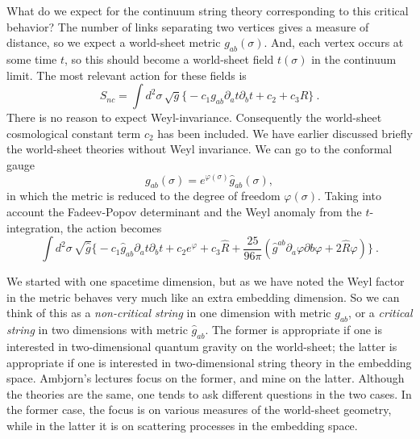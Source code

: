 
What do we expect for the continuum string theory corresponding to
this critical behavior?  The number of links separating two vertices
gives a measure of distance, so we expect a world-sheet metric
$g_{ab}(\sigma)$.  And, each vertex occurs at some time $t$, so this
should become a world-sheet field $t(\sigma)$ in the continuum limit. 
The most relevant action for these fields is
\begin{equation}
S_{nc} = \int d^2\sigma \, \sqrt{g} \biggl\{
-c_1 g_{ab} \partial_a t \partial_b t + c_2 + c_3 R \biggr\}\ .
\end{equation}
There is no reason to expect Weyl-invariance.  Consequently the
world-sheet cosmological constant term $c_2$ has been included.
We have earlier discussed briefly the world-sheet theories without
Weyl invariance.  We can go to the conformal gauge
\begin{equation}
g_{ab}(\sigma) = e^{\varphi(\sigma)} \hat g_{ab}(\sigma),
\end{equation}
in which the metric is reduced to the degree of freedom
$\varphi(\sigma)$. Taking into account the Fadeev-Popov
determinant and the Weyl anomaly from the $t$-integration, the
action becomes~\cite{Poly1}
\begin{equation}
\int d^2\sigma \, \sqrt{\hat g} \biggl\{
-c_1 \hat g_{ab} \partial_a t \partial_b t + c_2 e^{\varphi} + c_3
\hat R + \frac{25}{96\pi} 
( \hat g^{ab} \partial_a \varphi \partial b \varphi + 2 \hat R
\varphi ) \biggr\}\ . \label{tvar}
\end{equation}

We started with one spacetime dimension, but as we have noted
the Weyl factor in the metric behaves very much like an extra
embedding dimension.  So we can think of this as a
{\it non-critical
string} in one dimension with metric $g_{ab}$, or a {\it critical
string} in two dimensions with metric $\hat g_{ab}$.  The former is
appropriate if one is interested in two-dimensional quantum
gravity on the world-sheet; the latter is appropriate if one is
interested in two-dimensional string theory in the embedding space.
Ambjorn's lectures focus on the former, and mine
on the latter.  Although the theories are the same, one tends to
ask different questions in the two cases.  In the former case,
the focus is on various measures of the world-sheet geometry, while
in the latter it is on scattering processes in the embedding
space. 

